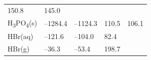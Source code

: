 \documentclass[
]{book}
\theoremstyle{definition}
\theoremstyle{definition}
\theoremstyle{definition}
\theoremstyle{remark}
\begin{document}
\begin{longtable}[]{@{}lllll@{}}
\begin{minipage}[t]{0.18\columnwidth}
150.8\strut
\end{minipage} & \begin{minipage}[t]{0.18\columnwidth}\raggedright
145.0\strut
\end{minipage}\tabularnewline
\begin{minipage}[t]{0.10\columnwidth}\raggedright
H\textsubscript{3}PO\textsubscript{4}(s)\strut
\end{minipage} & \begin{minipage}[t]{0.19\columnwidth}\raggedright
--1284.4\strut
\end{minipage} & \begin{minipage}[t]{0.20\columnwidth}\raggedright
--1124.3\strut
\end{minipage} & \begin{minipage}[t]{0.18\columnwidth}\raggedright
110.5\strut
\end{minipage} & \begin{minipage}[t]{0.18\columnwidth}\raggedright
106.1\strut
\end{minipage}\tabularnewline
\begin{minipage}[t]{0.10\columnwidth}\raggedright
HBr(aq)\strut
\end{minipage} & \begin{minipage}[t]{0.19\columnwidth}\raggedright
--121.6\strut
\end{minipage} & \begin{minipage}[t]{0.20\columnwidth}\raggedright
--104.0\strut
\end{minipage} & \begin{minipage}[t]{0.18\columnwidth}\raggedright
82.4\strut
\end{minipage} & \begin{minipage}[t]{0.18\columnwidth}\raggedright
\strut
\end{minipage}\tabularnewline
\begin{minipage}[t]{0.10\columnwidth}\raggedright
HBr(g)\strut
\end{minipage} & \begin{minipage}[t]{0.19\columnwidth}\raggedright
--36.3\strut
\end{minipage} & \begin{minipage}[t]{0.20\columnwidth}\raggedright
--53.4\strut
\end{minipage} & \begin{minipage}[t]{0.18\columnwidth}\raggedright
198.7\strut
\end{minipage} & \begin{minipage}[t]{0.18\columnwidth}\raggedright

\end{minipage}
\end{longtable}
\end{document}
